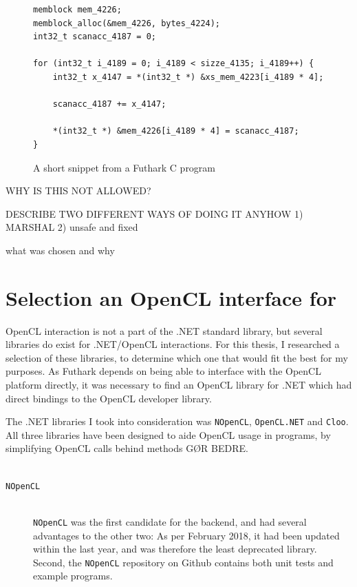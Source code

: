 \begin{description}
\begin{figure}
\centering
\begin{verbatim}
memblock mem_4226;
memblock_alloc(&mem_4226, bytes_4224);
int32_t scanacc_4187 = 0;

for (int32_t i_4189 = 0; i_4189 < sizze_4135; i_4189++) {
    int32_t x_4147 = *(int32_t *) &xs_mem_4223[i_4189 * 4];
    
    scanacc_4187 += x_4147;

    *(int32_t *) &mem_4226[i_4189 * 4] = scanacc_4187;
}
\end{verbatim}
\caption{A short snippet from a Futhark C program}
\label{fig:futharkcscene}
\end{figure}

WHY IS THIS NOT ALLOWED?

DESCRIBE TWO DIFFERENT WAYS OF DOING IT ANYHOW
1) MARSHAL
2) unsafe and fixed

what was chosen and why



\section{Selection an OpenCL interface for \csharp{}}
OpenCL interaction is not a part of the .NET standard library, but several
libraries do exist for .NET/OpenCL interactions. For this thesis, I researched a
selection of these libraries, to determine which one that would fit the best for
my purposes.
As Futhark depends on being able to interface with the OpenCL platform directly,
it was necessary to find an OpenCL library for .NET which had direct bindings to
the OpenCL developer library.

The .NET libraries I took into consideration was \texttt{NOpenCL}, \texttt{OpenCL.NET} and \texttt{Cloo}.
All three libraries have been designed to aide OpenCL usage in \csharp{}
programs, by simplifying OpenCL calls behind methods GØR BEDRE.
\\
\\
\begin{description}
\item[\texttt{NOpenCL}]\hfill\\
\texttt{NOpenCL} was the first candidate for the \csharp{} backend, and had
several advantages to the other two: As per February 2018, it had been updated
within the last year, and was therefore the least deprecated library. Second,
the \texttt{NOpenCL} repository on Github contains both unit tests and
example programs.


\end{description}
\end{description}
